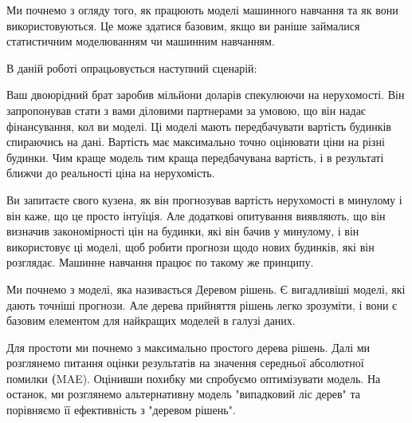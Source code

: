 \Introduction

Ми почнемо з огляду того, як працюють моделі машинного навчання та як вони використовуються.
Це може здатися базовим, якщо ви раніше займалися статистичним моделюванням чи машинним навчанням.

В даній роботі опрацьовується наступний сценарій:

Ваш двоюрідний брат заробив мільйони доларів спекулюючи на нерухомості.
Він запропонував стати з вами діловими партнерами за умовою, що він надає фінансування, кол ви моделі.
Ці моделі мають передбачувати вартість будинків спираючись на дані.
Вартість має максимально точно оцінювати ціни на різні будинки.
Чим краще модель тим краща передбачувана вартість, і в результаті ближчи до реальності ціна на нерухомість.

Ви запитаєте свого кузена, як він прогнозував вартість нерухомості в минулому і він каже, що це просто інтуїція.
Але додаткові опитування виявляють, що він визначив закономірності цін на будинки, які він бачив у минулому, і він використовує ці моделі, щоб робити прогнози щодо нових будинків, які він розглядає.
Машинне навчання працює по такому же принципу.

Ми почнемо з моделі, яка називається Деревом рішень.
Є вигадливіші моделі, які дають точніші прогнози.
Але дерева прийняття рішень легко зрозуміти, і вони є базовим елементом для найкращих моделей в галузі даних.

Для простоти ми почнемо з максимально простого дерева рішень.
Далі ми розглянемо питання оцінки результатів на значення середньої абсолютної помилки \textbf(MAE).
Оцінивши похибку ми спробуємо оптимізувати модель.
На останок, ми розглянемо альтернативну модель "випадковий ліс дерев" та порівняємо її ефективність з "деревом рішень".
